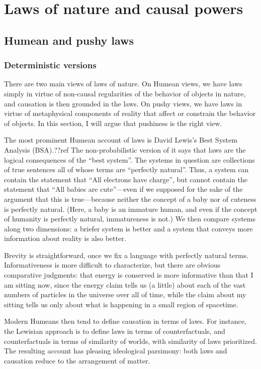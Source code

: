 \def\mychapter{IX}

\chapter{Laws of nature and causal powers}\label{ch:laws}
\section{Humean and pushy laws}
\subsection{Deterministic versions}
There are two main views of laws of nature. On Humean views, we have laws simply in virtue of non-causal 
regularities of the behavior of objects in nature, and causation is then grounded in the laws. On pushy views, 
we have laws in virtue of metaphysical components of reality that affect or constrain the behavior of objects. 
In this section, I will argue that pushiness is the right view. 

The most prominent Humean account of laws is David Lewis's Best System Analysis (BSA).??ref The non-probabilistic version of it says that laws are the 
logical consequences of the ``best system''. The systems in question are collections of true sentences all of whose terms
are ``perfectly natural''. Thus, a system can contain the statement that ``All electrons have charge'', but cannot contain
the statement that ``All babies are cute''---even if we supposed for the sake of the argument that this is true---because
neither the concept of a baby nor of cuteness is perfectly natural. (Here, a baby is an immature human, and even if 
the concept of humanity is perfectly natural, immatureness is not.) We then compare systems along two dimensions:
a briefer system is better and a system that conveys more information about reality is also better.

Brevity is straightforward, once we fix a language with perfectly natural terms. Informativeness is more difficult 
to characterize, but there are obvious comparative judgments: that energy is conserved is more informative than that
I am sitting now, since the energy claim tells us (a little) about each of the vast numbers of particles in the universe 
over all of time, while the claim about my sitting tells us only about what is happening in a small region of spacetime. 

Modern Humeans then tend to define causation in terms of laws. For instance, the Lewisian approach is to define laws
in terms of counterfactuals, and counterfactuals in terms of similarity of worlds, with similarity of laws prioritized.
The resulting account has pleasing ideological parsimony: both laws and causation reduce to the arrangement of matter.

